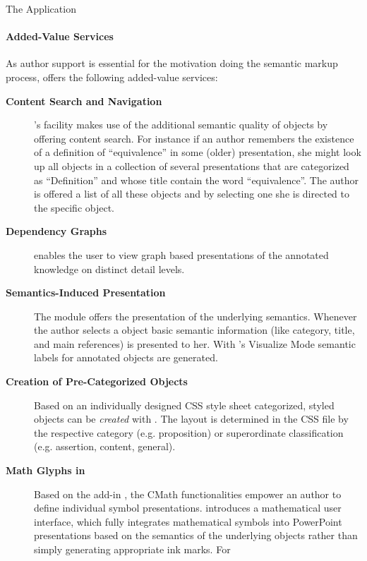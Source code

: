 \begin{omgroup}[id=cpoint,short=\cpoint,creators=ako]
\begin{omgroup}[id=cpoint.app]{The {\cpoint} Application}
\paragraph{Added-Value Services}\label{sec:auxiliaries}
As author support is essential for the motivation doing the semantic markup process,
{\cpoint} offers the following added-value services:
\begin{description}
\item[{\bf{Content Search and
      Navigation}}] {\cpoint}'s
  {} facility makes use of the additional semantic quality of {\ppt} objects
  by offering content search. For instance if an author remembers the existence of a
  definition of ``equivalence'' in some (older) {\ppt} presentation, she might look up all
  {\ppt} objects in a collection of several {\ppt} presentations that are categorized as
  ``Definition'' and whose title contain the word ``equivalence''. The author is offered a list
  of all these objects and by selecting one she is directed to the specific {\ppt} object.
\item[{\bf Dependency Graphs}] {\cpgraphs} enables the user to
  view graph based presentations of the annotated knowledge on distinct detail levels.
\item[{\bf Semantics-Induced Presentation}] The
  module {\cpauthor} offers the presentation of the underlying semantics. Whenever the
  author selects a {\ppt} object basic semantic information (like category, title, and
  main references) is presented to her. With {\cpoint}'s Visualize Mode semantic labels
  for annotated {\ppt} objects are generated.
\item[{\bf Creation of Pre-Categorized {\ppt} Objects}] Based on an individually designed
  CSS style sheet categorized, styled {\ppt} objects can be {\emph{created}} with
  {\cpauthor}. The layout is determined in the CSS file by the respective category (e.g.
  proposition) or superordinate classification (e.g. assertion, content, general).
\item[{\bf Math Glyphs in {\ppt}}] Based on the {\ppt} add-in
  {\texpoint}, the CMath functionalities empower an author to define individual symbol
  presentations. {\cpoint} introduces a mathematical user interface, which fully
  integrates mathematical symbols into PowerPoint presentations based on the semantics of
  the underlying objects rather than simply generating appropriate ink marks. For

\end{description}
\end{omgroup}
\end{omgroup}
